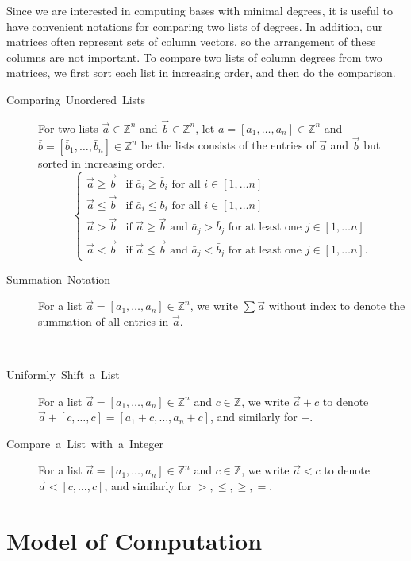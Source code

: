 Since we are interested in computing bases with minimal degrees, it
is useful to have convenient notations for comparing two lists of
degrees.   In addition, our matrices often represent sets of column
vectors, so the arrangement of these columns are not important. To
compare two lists of column degrees from two matrices, we first sort
each list in increasing order, and then do the comparison.
\begin{description}
\item [{Comparing~Unordered~Lists}] For two lists $\vec{a}\in\mathbb{Z}^{n}$
and $\vec{b}\in\mathbb{Z}^{n}$, let $\bar{a}=\left[\bar{a}_{1},\dots,\bar{a}_{n}\right]\in\mathbb{Z}^{n}$
and $\bar{b}=\left[\bar{b}_{1},\dots,\bar{b}_{n}\right]\in\mathbb{Z}^{n}$
be the lists consists of the entries of $\vec{a}$ and $\vec{b}$
but sorted in increasing order. 
\[
\begin{cases}
\vec{a}\ge\vec{b} & \mbox{if }\bar{a}_{i}\ge\bar{b}_{i}\mbox{ for all }i\in\left[1,\dots n\right]\\
\vec{a}\le\vec{b} & \mbox{if }\bar{a}_{i}\le\bar{b}_{i}\mbox{ for all }i\in\left[1,\dots n\right]\\
\vec{a}>\vec{b} & \mbox{if }\vec{a}\ge\vec{b}\mbox{ and }\bar{a}_{j}>\bar{b}_{j}\mbox{ for at least one }j\in\left[1,\dots n\right]\\
\vec{a}<\vec{b} & \mbox{if }\vec{a}\le\vec{b}\mbox{ and }\bar{a}_{j}<\bar{b}_{j}\mbox{ for at least one }j\in\left[1,\dots n\right].
\end{cases}
\]

\item [{Summation~Notation}] For a list $\vec{a}=\left[a_{1},\dots,a_{n}\right]\in\mathbb{Z}^{n}$,
we write $\sum\vec{a}$ without index to denote the summation of all
entries in $\vec{a}$. 
\item [{}]~
\item [{Uniformly~Shift~a~List}] For a list $\vec{a}=\left[a_{1},\dots,a_{n}\right]\in\mathbb{Z}^{n}$
and $c\in\mathbb{Z}$, we write $\vec{a}+c$ to denote $\vec{a}+\left[c,\dots,c\right]=\left[a_{1}+c,\dots,a_{n}+c\right]$,
and similarly for $-$.
\item [{Compare~a~List~with~a~Integer}] For a list $\vec{a}=\left[a_{1},\dots,a_{n}\right]\in\mathbb{Z}^{n}$
and $c\in\mathbb{Z}$, we write $\vec{a}<c$ to denote $\vec{a}<\left[c,\dots,c\right]$,
and similarly for $>,\le,\ge,=$.
\end{description}

\section{Model of Computation}

